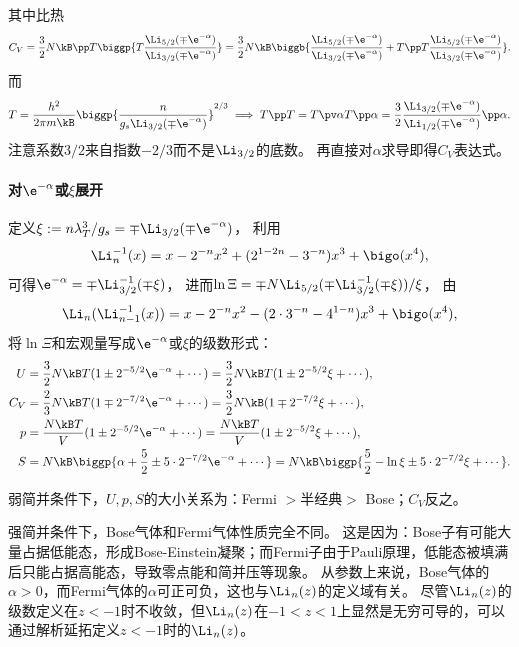 其中比热
\[
	C_V=\frac32N\kB\pp T\biggp{T\frac{\Li_{5/2}(\mp\e^{-\alpha})}{\Li_{3/2}(\mp\e^{-\alpha})}}=\frac32N\kB\biggb{\frac{\Li_{5/2}(\mp\e^{-\alpha})}{\Li_{3/2}(\mp\e^{-\alpha})}+T\pp T\frac{\Li_{5/2}(\mp\e^{-\alpha})}{\Li_{3/2}(\mp\e^{-\alpha})}}.
\]
而
\[
	T=\frac{h^2}{2\pi m\kB}\biggp{\frac{n}{g_s\Li_{3/2}(\mp\e^{-\alpha})}}^{2/3}
	\implies
	T\pp T=T\pv\alpha T\pp\alpha=\frac32\frac{\Li_{3/2}(\mp\e^{-\alpha})}{\Li_{1/2}(\mp\e^{-\alpha})}\pp\alpha.
\]
注意系数$3/2$来自指数$-2/3$而不是$\Li_{3/2}$的底数。
再直接对$\alpha$求导即得$C_V$表达式。

\paragraph{对$\e^{-\alpha}$或$\xi$展开}

定义$\xi:=n\lambda_T^3/g_s=\mp\Li_{3/2}(\mp\e^{-\alpha})$，
利用
\[
	\Li_n^{-1}(x)=x-2^{-n}x^2+(2^{1-2n}-3^{-n})x^3+\bigo(x^4),
\]
可得$\e^{-\alpha}=\mp\Li_{3/2}^{-1}(\mp\xi)$，
进而$\ln\Xi=\mp N\Li_{5/2}(\mp\Li_{3/2}^{-1}(\mp\xi))/\xi$，
由
\[
	\Li_n(\Li_{n-1}^{-1}(x))=x-2^{-n}x^2-(2\cdot 3^{-n}-4^{1-n})x^3+\bigo(x^4),
\]
将$\ln\Xi$和宏观量写成$\e^{-\alpha}$或$\xi$的级数形式：
\begin{subequations}
	\begin{align}
		U&=\frac32N\kB T(1\pm 2^{-5/2}\e^{-\alpha}+\cdots)=\frac32N\kB T(1\pm 2^{-5/2}\xi+\cdots),\\
		C_V&=\frac23N\kB T(1\mp 2^{-7/2}\e^{-\alpha}+\cdots)=\frac32N\kB(1\mp 2^{-7/2}\xi+\cdots),\\
		p&=\frac{N\kB T}V(1\pm 2^{-5/2}\e^{-\alpha}+\cdots)=\frac{N\kB T}V(1\pm 2^{-5/2}\xi+\cdots),\\
		S&=N\kB\biggp{\alpha+\frac52\pm 5\cdot2^{-7/2}\e^{-\alpha}+\cdots}=N\kB\biggp{\frac52-\ln\xi\pm 5\cdot 2^{-7/2}\xi+\cdots}.
	\end{align}
\end{subequations}

\begin{corollary}
	弱简并条件下，$U,p,S$的大小关系为：Fermi $>$半经典$>$ Bose；$C_V$反之。
\end{corollary}

\begin{remark}
	强简并条件下，Bose气体和Fermi气体性质完全不同。
	这是因为：Bose子有可能大量占据低能态，形成Bose-Einstein凝聚；而Fermi子由于Pauli原理，低能态被填满后只能占据高能态，导致零点能和简并压等现象。
	从参数上来说，Bose气体的$\alpha>0$，而Fermi气体的$\alpha$可正可负，这也与$\Li_n(z)$的定义域有关。
	尽管$\Li_n(z)$的级数定义在$z<-1$时不收敛，但$\Li_n(z)$在$-1<z<1$上显然是无穷可导的，可以通过解析延拓定义$z<-1$时的$\Li_n(z)$。
\end{remark}

